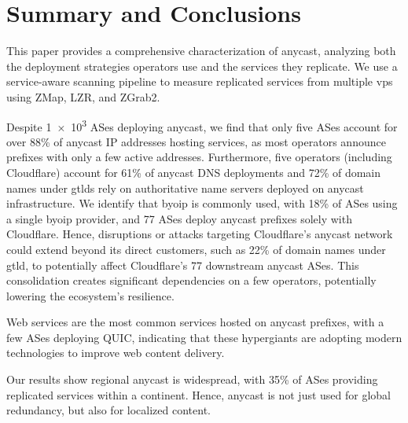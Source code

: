 
\section{Summary and Conclusions}\label{sec:conclusions}
This paper provides a comprehensive characterization of anycast, analyzing both the deployment strategies operators use and the services they replicate.
We use a service-aware scanning pipeline to measure replicated services from multiple \glspl{vp} using ZMap, LZR, and ZGrab2\@.

Despite \num{1e3} ASes deploying anycast, we find that only five ASes account for over 88\% of anycast IP addresses hosting services, as most operators announce prefixes with only a few active addresses.
Furthermore, five operators (including Cloudflare) account for 61\% of anycast DNS deployments and 72\% of domain names under \glspl{gtld} rely on authoritative name servers deployed on anycast infrastructure.
We identify that \gls{byoip} is commonly used, with 18\% of ASes using a single \gls{byoip} provider, and \num{77} ASes deploy anycast prefixes solely with Cloudflare.
Hence, disruptions or attacks targeting Cloudflare's anycast network~\cite{_CloudflareOutageNovember_2025,_DetailsCloudflareOutage_2019} could extend beyond its direct customers, such as 22\% of domain names under \gls{gtld}, to potentially affect Cloudflare's \num{77} downstream anycast ASes.
This consolidation creates significant dependencies on a few operators, potentially lowering the ecosystem's resilience.

Web services are the most common services hosted on anycast prefixes, with a few ASes deploying QUIC, indicating that these hypergiants are adopting modern technologies to improve web content delivery.

Our results show regional anycast is widespread, with 35\% of ASes providing replicated services within a continent.
Hence, anycast is not just used for global redundancy, but also for localized content.
